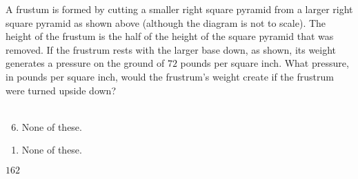  
\begin{center}\hspace{5mm}\end{center}
A frustum is formed by cutting a smaller right square pyramid from a larger right square pyramid as shown above (although the diagram is not to scale).  The height of the frustum is the half of the height of the square pyramid that was removed.  If the frustrum rests with the larger base down, as shown, its weight generates a pressure on the ground of $72$ pounds per square inch.  What pressure, in pounds per square inch, would the frustrum's weight create if the frustrum were turned upside down?\\\\


\ifsat
	\begin{enumerate}[label=\Alph*)]
	\end{enumerate}
\else
\fi

\ifacteven
	\begin{enumerate}[label=\textbf{\Alph*.},itemsep=\fill,align=left]
		\setcounter{enumii}{5}
		\item None of these. 
	\end{enumerate}
\else
\fi

\ifactodd
	\begin{enumerate}[label=\textbf{\Alph*.},itemsep=\fill,align=left]
		\item None of these. 
	\end{enumerate}
\else
\fi

\ifgridin
$162$
\else
\fi

